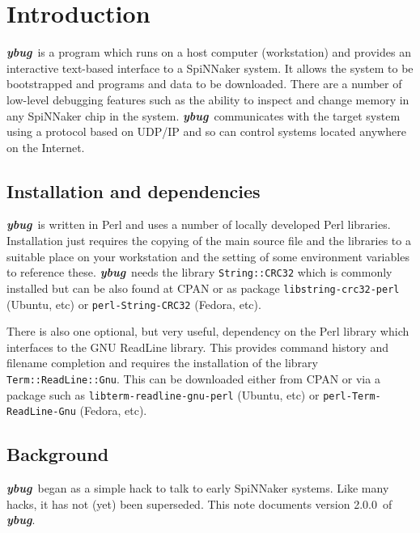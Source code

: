 
\def\FullTitle{\textsl{ybug} - System Control Tool for SpiNNaker}
\def\ShortTitle{ybug 2.0.0}
\def\Date{8 Mar 2016}
\def\Version{2.0.0}
\def\Author{Steve Temple}
\def\Email{steven.temple@manchester.ac.uk}



\newcommand{\ybug}{\textbf{\textsl{ybug}}}

\section{Introduction}

\ybug\ is a program which runs on a host computer (workstation) and
provides an interactive text-based interface to a SpiNNaker system.
It allows the system to be bootstrapped and programs and data to be
downloaded. There are a number of low-level debugging features such as
the ability to inspect and change memory in any SpiNNaker chip in the
system. \ybug\ communicates with the target system using a protocol
based on UDP/IP and so can control systems located anywhere on the
Internet.

\subsection{Installation and dependencies}

\ybug\ is written in Perl and uses a number of locally developed Perl
libraries. Installation just requires the copying of the main source
file and the libraries to a suitable place on your workstation and the
setting of some environment variables to reference these. \ybug\ needs
the library \texttt{String::CRC32} which is commonly installed but
can be also found at CPAN or as package \texttt{libstring-crc32-perl}
(Ubuntu, etc) or \texttt{perl-String-CRC32} (Fedora, etc).

There is also one optional, but very useful, dependency on the Perl
library which interfaces to the GNU ReadLine library. This provides
command history and filename completion and requires the installation
of the library \texttt{Term::ReadLine::Gnu}. This can be downloaded
either from CPAN or via a package such
as \texttt{libterm-readline-gnu-perl} (Ubuntu, etc)
or \texttt{perl-Term-ReadLine-Gnu} (Fedora, etc).

\subsection{Background}

\ybug\ began as a simple hack to talk to early SpiNNaker systems. Like
many hacks, it has not (yet) been superseded. This note documents
version \Version\ of \ybug.

